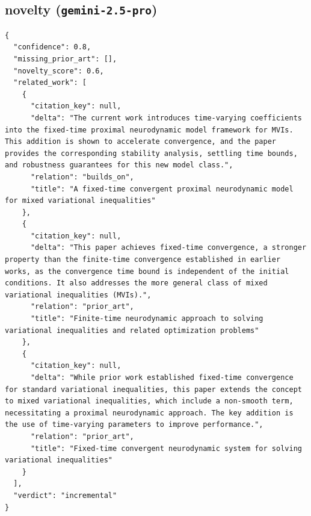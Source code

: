 \documentclass[11pt]{article}
\begin{document}
\subsection*{novelty (\texttt{gemini-2.5-pro})}
\begin{verbatim}
{
  "confidence": 0.8,
  "missing_prior_art": [],
  "novelty_score": 0.6,
  "related_work": [
    {
      "citation_key": null,
      "delta": "The current work introduces time-varying coefficients into the fixed-time proximal neurodynamic model framework for MVIs. This addition is shown to accelerate convergence, and the paper provides the corresponding stability analysis, settling time bounds, and robustness guarantees for this new model class.",
      "relation": "builds_on",
      "title": "A fixed-time convergent proximal neurodynamic model for mixed variational inequalities"
    },
    {
      "citation_key": null,
      "delta": "This paper achieves fixed-time convergence, a stronger property than the finite-time convergence established in earlier works, as the convergence time bound is independent of the initial conditions. It also addresses the more general class of mixed variational inequalities (MVIs).",
      "relation": "prior_art",
      "title": "Finite-time neurodynamic approach to solving variational inequalities and related optimization problems"
    },
    {
      "citation_key": null,
      "delta": "While prior work established fixed-time convergence for standard variational inequalities, this paper extends the concept to mixed variational inequalities, which include a non-smooth term, necessitating a proximal neurodynamic approach. The key addition is the use of time-varying parameters to improve performance.",
      "relation": "prior_art",
      "title": "Fixed-time convergent neurodynamic system for solving variational inequalities"
    }
  ],
  "verdict": "incremental"
}
\end{verbatim}
\end{document}

